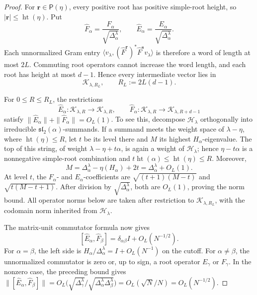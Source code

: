 \documentclass[11pt]{article}
\theoremstyle{remark}
\theoremstyle{plain}
\newcommand{\cH}{\mathcal H}
\begin{document}
\begin{proof}
For \(\mathbf r\in\mathsf P(\eta)\), every positive root has positive
simple-root height, so
\(|\mathbf r|\le\operatorname{ht}(\eta)\).  Put
\[
  \widehat F_\alpha=\frac{F_\alpha}{\sqrt{\Delta_\alpha^\lambda}},
  \qquad
  \widehat E_\alpha=\frac{E_\alpha}{\sqrt{\Delta_\alpha^\lambda}}.
\]
Each unnormalized Gram entry
\(\langle v_\lambda,(\widehat F^{\mathbf r})^*
\widehat F^{\mathbf s}v_\lambda\rangle\) is therefore a word of length at
most \(2L\).  Commuting root operators cannot increase the word length, and
each root has height at most \(d-1\).  Hence every intermediate vector lies
in
\[
  \mathcal K_{\lambda,R_L},
  \qquad R_L:=2L(d-1).
\]

For \(0\le R\le R_L\), the restrictions
\[
  \widehat E_\alpha:\mathcal K_{\lambda,R}\to\mathcal K_{\lambda,R},
  \qquad
  \widehat F_\alpha:\mathcal K_{\lambda,R}
  \to\mathcal K_{\lambda,R+d-1}
\]
satisfy
\(\|\widehat E_\alpha\|+\|\widehat F_\alpha\|=O_L(1)\).  To see this,
decompose \(\cH_\lambda\) orthogonally into irreducible
  \(\mathfrak{sl}_2(\alpha)\)-summands.  If a summand meets the weight space
  of \(\lambda-\eta\), where \(\operatorname{ht}(\eta)\le R\), let \(t\) be
  its level there and \(M\) its highest \(H_\alpha\)-eigenvalue.
  The top of this string, of weight
  \(\lambda-\eta+t\alpha\), is again a weight of \(\cH_\lambda\); hence
  \(\eta-t\alpha\) is a nonnegative simple-root combination and
  \(t\operatorname{ht}(\alpha)\le\operatorname{ht}(\eta)\le R\).  Moreover,
\[
  M=\Delta_\alpha^\lambda-\eta(H_\alpha)+2t
   =\Delta_\alpha^\lambda+O_L(1).
\]
At level \(t\), the \(F_\alpha\)- and \(E_\alpha\)-coefficients are
\(\sqrt{(t+1)(M-t)}\) and \(\sqrt{t(M-t+1)}\).  After division by
\(\sqrt{\Delta_\alpha^\lambda}\), both are \(O_L(1)\), proving the norm
bound.  All operator norms below are taken after restriction to
\(\mathcal K_{\lambda,R_L}\), with the codomain norm inherited from
\(\cH_\lambda\).

The matrix-unit commutator formula now gives
\begin{equation}\label{eq:normalized-root-commutator}
  [\widehat E_\alpha,\widehat F_\beta]
  =\delta_{\alpha\beta}I+O_L(N^{-1/2}).
\end{equation}
For \(\alpha=\beta\), the left side is
\(H_\alpha/\Delta_\alpha^\lambda=I+O_L(N^{-1})\) on the cutoff.
For \(\alpha\ne\beta\), the unnormalized commutator is zero or,
up to sign, a root operator \(E_\gamma\) or \(F_\gamma\).  In the nonzero
case, the preceding bound gives
\(\|[\widehat E_\alpha,\widehat F_\beta]\|
=O_L\bigl(\sqrt{\Delta_\gamma^\lambda}/
\sqrt{\Delta_\alpha^\lambda\Delta_\beta^\lambda}\bigr)
=O_L(\sqrt N/N)=O_L(N^{-1/2})\).


\end{proof}
\end{document}

